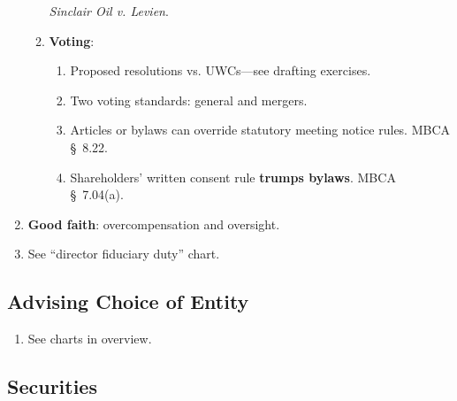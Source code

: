 \begin{enumerate}
\begin{enumerate}
        \emph{Sinclair Oil v. Levien}.
        \item \textbf{Voting}:
        \begin{enumerate}
            \item Proposed resolutions vs. UWCs---see drafting exercises.
            \item Two voting standards: general and mergers.
            \item Articles or bylaws can override statutory meeting notice 
            rules. MBCA \S\ 8.22.
            \item Shareholders' written consent rule \textbf{trumps bylaws}. 
            MBCA \S\ 7.04(a). 
        \end{enumerate}
    \end{enumerate}
    \item \textbf{Good faith}: overcompensation and oversight.
    \item See ``director fiduciary duty'' chart.
\end{enumerate}

\newpage

\subsection{Advising Choice of Entity}

\begin{enumerate}
    \item See charts in overview.
\end{enumerate}

\newpage

\subsection{Securities}

